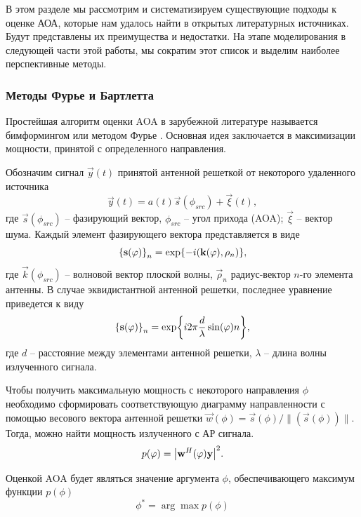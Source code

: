В этом разделе мы рассмотрим и систематизируем существующие подходы к оценке
АОА, которые нам удалось найти в открытых литературных источниках.  Будут
представлены их преимущества и недостатки.  На этапе моделирования в следующей
части этой работы, мы сократим этот список и выделим наиболее перспективные
методы.

\subsubsection{Методы Фурье и Бартлетта}
\label{sec:3.2.1} \label{sec:Fourier}

Простейшая алгоритм оценки AOA в зарубежной литературе называется бимформингом \cite{Tuncer2009, Stoica2005} или методом Фурье \cite{Allen2006}.
Основная идея заключается в максимизации мощности, принятой с определенного
направления.

Обозначим сигнал $\vec{y}(t)$ принятой антенной решеткой от некоторого
удаленного источника
\begin{equation}
    \label{eq:3.1}
    \vec{y}(t) = a(t) \vec{s}(\phi_{src}) + \vec{\xi}(t),
\end{equation}
где ${\vec{s}(\phi_{src})}$ -- фазирующий вектор,
$\phi_{src}$ -- угол прихода (AOA); $\vec \xi$ -- вектор шума.
Каждый элемент фазирующего вектора представляется в виде
\begin{equation}
    \label{eq:3.2}
    \qty{\vec{s}(\phi)}_n = \exp{-i(\vec k (\phi), \vec \rho_n)},
\end{equation}
где $\vec k (\phi_{src})$ -- волновой вектор плоской волны, $\vec\rho_n$ радиус-вектор
$n$-го элемента антенны.
В случае эквидистантной антенной решетки, последнее уравнение приведется
к виду
\begin{equation}
    \qty{\vec s(\phi)}_n = \exp{i2\pi\frac{d}{\lambda}\sin(\phi)n},
\end{equation}
где $d$ -- расстояние между элементами антенной решетки, $\lambda$ -- длина
волны излученного сигнала.

Чтобы получить максимальную мощность с некоторого направления $\phi$ необходимо
сформировать соответствующую диаграмму направленности с помощью
весового вектора антенной решетки $\vec w (\phi) = \vec s(\phi)/\rVert(\vec
    s(\phi))\lVert$.  Тогда, можно найти мощность излученного с АР сигнала.
\begin{equation}
    p(\phi) = \abs{\vec w^H (\phi) \vec y}^2.
\end{equation}

Оценкой AOA будет являться значение аргумента $\phi$, обеспечивающего максимум функции $p(\phi)$
\begin{equation}
    \phi^* = \arg\max p(\phi)
\end{equation}

